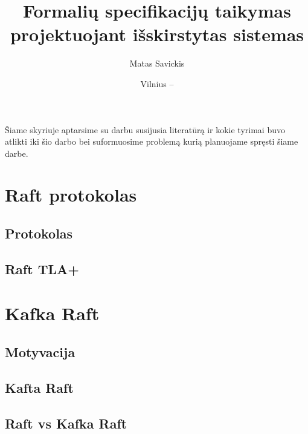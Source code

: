 \documentclass{VUMIFPSmagistrinis}
\title{Formalių specifikacijų taikymas projektuojant išskirstytas sistemas}
\author{Matas Savickis}
\date{Vilnius – \the\year}
\begin{document}

\maketitle

\tableofcontents

Šiame skyriuje aptarsime su darbu susijusia literatūrą ir kokie tyrimai buvo atlikti iki šio darbo bei suformuosime problemą kurią planuojame spręsti šiame darbe.


\section{Raft protokolas}
	\subsection{Protokolas}
	\subsection{Raft TLA+}

\section{Kafka Raft}
	\subsection{Motyvacija}
	\subsection{Kafta Raft}
	\subsection{Raft vs Kafka Raft}




\printbibliography[heading=bibintoc] 
\end{document}
